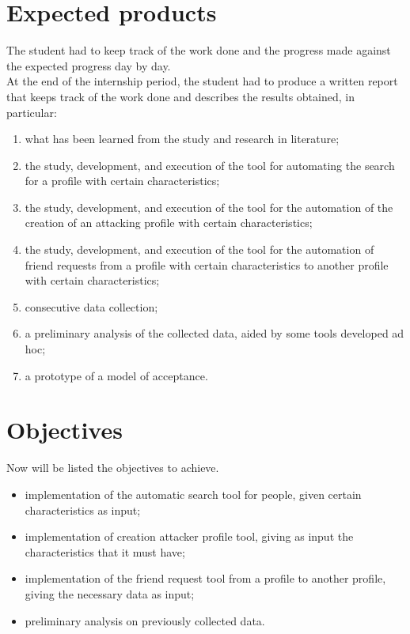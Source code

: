 \section{Expected products}
The student had to keep track of the work done and the progress made against the expected progress day by day.\\
At the end of the internship period, the student had to produce a written report that keeps track of the work done and describes the results obtained, in particular:
\begin{enumerate}
	\item what has been learned from the study and research in literature; 
	\item the study, development, and execution of the tool for automating the search for a profile with certain characteristics;
	\item the study, development, and execution of the tool for the automation of the creation of an attacking profile with certain characteristics;
	\item the study, development, and execution of the tool for the automation of friend requests from a profile with certain characteristics to another profile with certain characteristics;	
	\item consecutive data collection; 
	\item a preliminary analysis of the collected data, aided by some tools developed ad hoc; 
	\item a prototype of a model of acceptance.
\end{enumerate}
\section{Objectives}
Now will be listed the objectives to achieve.
\begin{itemize}
\item implementation of the automatic search tool for people, given certain characteristics as input;
\item implementation of creation attacker profile tool, giving as input the characteristics that it must have;
\item implementation of the friend request tool from a profile to another profile, giving the necessary data as input;
\item preliminary analysis on previously collected data.
\end{itemize}

